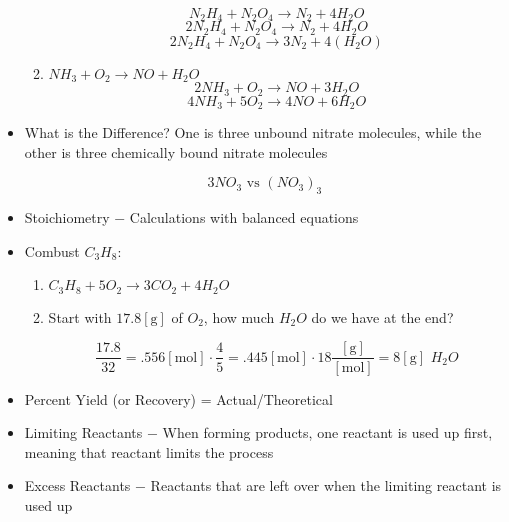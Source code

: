 \documentclass[12pt]{article}
\begin{document}
\begin{itemize}
\begin{enumerate}
        $$N_2H_4+N_2O_4\rightarrow N_2+4H_2O$$
        $$2N_2H_4+N_2O_4\rightarrow N_2+4H_2O$$
        $$2N_2H_4+N_2O_4\rightarrow 3N_2+4(H_2O)$$

      \item $NH_3+O_2\rightarrow NO +H_2O$
       $$2NH_3 + O_2\rightarrow NO + 3H_2O$$
       $$4NH_3 + 5O_2\rightarrow 4NO + 6H_2O$$

    \end{enumerate}

  \item What is the Difference? One is three unbound nitrate molecules, while the other is three chemically bound nitrate molecules

    $$3NO_3\text{ vs }(NO_3)_3$$

  \item Stoichiometry $-$ Calculations with balanced equations

  \item Combust $C_3H_8$:

    \begin{enumerate}

      \item $C_3H_8 + 5O_2\rightarrow 3CO_2 + 4H_2O$

      \item Start with $17.8[\si{\gram}]$ of $O_2$, how much $H_2O$ do we have at the end?

        $$\frac{17.8}{32}=.556[\si{\mole}]\cdot\frac{4}{5}=.445[\si{\mole}]\cdot18\frac{[\si{\gram}]}{[\si{\mole}]}=8[\si{\gram}]\,\,H_2O$$

    \end{enumerate}

  \item Percent Yield (or Recovery) = Actual/Theoretical
    
  \item Limiting Reactants $-$ When forming products, one reactant is used up first, meaning that reactant limits the process

  \item Excess Reactants $-$ Reactants that are left over when the limiting reactant is used up

\end{itemize}
\end{document}
